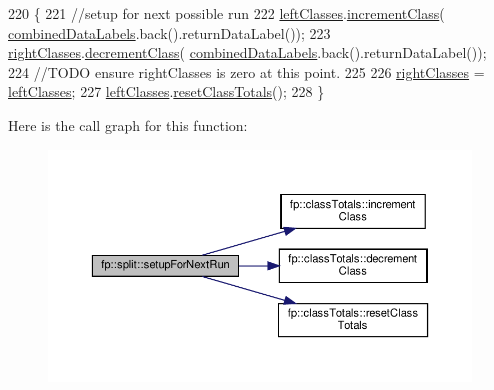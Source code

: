 \begin{DoxyCode}
220                                              \{
221                     \textcolor{comment}{//setup for next possible run}
222                     \hyperlink{classfp_1_1split_a3be6dcf32281715e6376e9f5f8da18f0}{leftClasses}.\hyperlink{classfp_1_1classTotals_aa05c13b36638adc361d638559c43a447}{incrementClass}(
      \hyperlink{classfp_1_1split_ac8f54cf4a42335814e10e351c49e3c32}{combinedDataLabels}.back().returnDataLabel());
223                     \hyperlink{classfp_1_1split_af5366297f7de9b8ff0911186300bab7e}{rightClasses}.\hyperlink{classfp_1_1classTotals_af388dc1e664488603f7834da2f097a06}{decrementClass}(
      \hyperlink{classfp_1_1split_ac8f54cf4a42335814e10e351c49e3c32}{combinedDataLabels}.back().returnDataLabel());
224                     \textcolor{comment}{//TODO ensure rightClasses is zero at this point.}
225 
226                     \hyperlink{classfp_1_1split_af5366297f7de9b8ff0911186300bab7e}{rightClasses} = \hyperlink{classfp_1_1split_a3be6dcf32281715e6376e9f5f8da18f0}{leftClasses};
227                     \hyperlink{classfp_1_1split_a3be6dcf32281715e6376e9f5f8da18f0}{leftClasses}.\hyperlink{classfp_1_1classTotals_ab0ad9daa63bc410ae15f344b86386f87}{resetClassTotals}();
228                 \}
\end{DoxyCode}
Here is the call graph for this function\+:\nopagebreak
\begin{figure}[H]
\begin{center}
\leavevmode
\includegraphics[width=350pt]{classfp_1_1split_a5ccfceb36e8ea567816af95bb4ae4fea_cgraph}
\end{center}
\end{figure}
\mbox{\label{classfp_1_1split_a8fc67880c45fe8a9f7ab8d0cc860597f}} 
